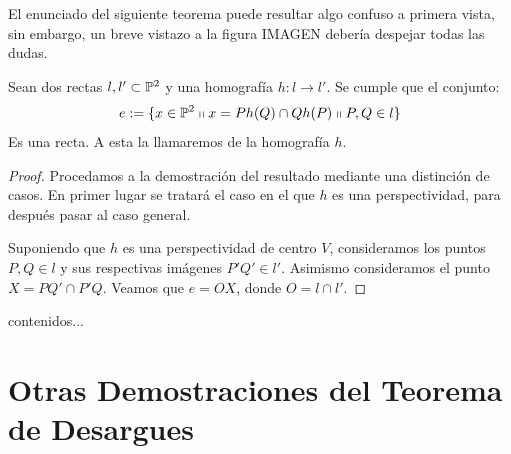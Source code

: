 El enunciado del siguiente teorema puede resultar algo confuso a primera vista, sin embargo, un breve vistazo a la figura IMAGEN debería despejar todas las dudas.
\begin{theo}
	\label{C7_teo_eje}
	Sean dos rectas $l,l'\subset\mathbb{P}^2$ y una homografía $h:l\to l'$. Se cumple que el conjunto:
	\[e:=\{x\in\mathbb{P}^2\shortparallel x=Ph(Q)\cap Qh(P)\shortparallel P,Q\in l\}\]
	Es una recta. A esta la llamaremos  de la homografía $h$. 
\end{theo}
\begin{proof}
	Procedamos a la demostración del resultado mediante una distinción de casos. En primer lugar se tratará el caso en el que $h$ es una perspectividad, para después pasar al caso general.
	
	Suponiendo que $h$ es una perspectividad de centro $V$, consideramos los puntos $P,Q\in l$ y sus respectivas imágenes $P'Q'\in l'$. Asimismo consideramos el punto $X=PQ'\cap P'Q$. Veamos que $e=OX$, donde $O=l\cap l'$.
\end{proof}
\begin{obs}
	contenidos...
\end{obs}
\section{Otras Demostraciones del Teorema de Desargues}